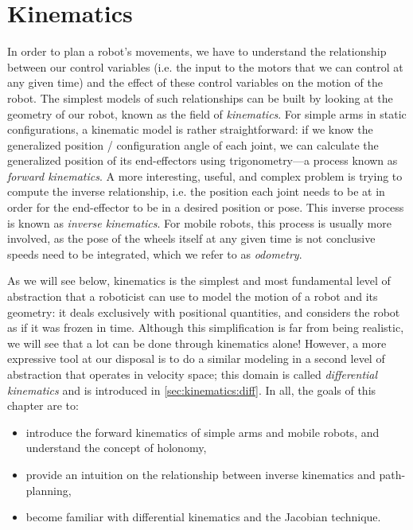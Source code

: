 \chapter{Kinematics}\label{chap:kinematics}

In order to plan a robot's movements, we have to understand the relationship between our control variables (i.e. the input to the motors that we can control at any given time) and the effect of these control variables on the motion of the robot.
The simplest models of such relationships can be built by looking at the geometry of our robot, known as the field of \textsl{kinematics}.
For simple arms in static configurations, a kinematic model is rather straightforward: if we know the generalized position / configuration angle of each joint, we can calculate the generalized position of its end-effectors using trigonometry---a process known as \textsl{forward kinematics}.
A more interesting, useful, and complex problem is trying to compute the inverse relationship, i.e. the position each joint needs to be at in order for the end-effector to be in a desired position or pose. This inverse process is known as \textsl{inverse kinematics}.
For mobile robots, this process is usually more involved, as the pose of the wheels itself at any given time is not conclusive speeds need to be integrated, which we refer to as \textsl{odometry}.

As we will see below, kinematics is the simplest and most fundamental level of abstraction that a roboticist can use to model the motion of a robot and its geometry: it deals exclusively with positional quantities, and considers the robot as if it was frozen in time. Although this simplification is far from being realistic, we will see that a lot can be done through kinematics alone! However, a more expressive tool at our disposal is to do a similar modeling in a second level of abstraction that operates in velocity space; this domain is called \textsl{differential kinematics} and is introduced in \cref{sec:kinematics:diff}.
In all, the goals of this chapter are to:

\begin{itemize}
\item introduce the forward kinematics of simple arms and mobile robots, and understand the concept of holonomy,
\item provide an intuition on the relationship between inverse kinematics and path-planning,
\item become familiar with differential kinematics and the Jacobian technique.
\end{itemize}

